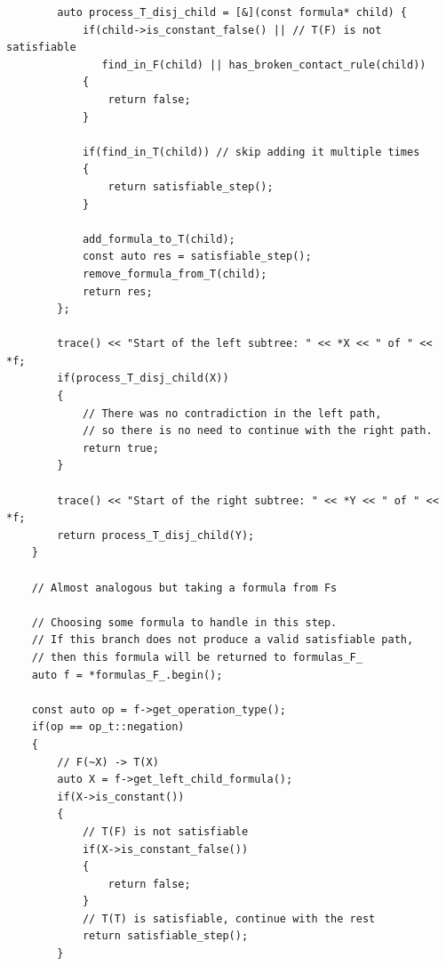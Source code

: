 \documentclass{article}
\begin{document}
\begin{lstlisting}
        auto process_T_disj_child = [&](const formula* child) {
            if(child->is_constant_false() || // T(F) is not satisfiable
               find_in_F(child) || has_broken_contact_rule(child))
            {
                return false;
            }

            if(find_in_T(child)) // skip adding it multiple times
            {
                return satisfiable_step();
            }

            add_formula_to_T(child);
            const auto res = satisfiable_step();
            remove_formula_from_T(child);
            return res;
        };

        trace() << "Start of the left subtree: " << *X << " of " << *f;
        if(process_T_disj_child(X))
        {
            // There was no contradiction in the left path,
            // so there is no need to continue with the right path.
            return true;
        }

        trace() << "Start of the right subtree: " << *Y << " of " << *f;
        return process_T_disj_child(Y);
    }

    // Almost analogous but taking a formula from Fs

    // Choosing some formula to handle in this step.
    // If this branch does not produce a valid satisfiable path,
    // then this formula will be returned to formulas_F_
    auto f = *formulas_F_.begin();

    const auto op = f->get_operation_type();
    if(op == op_t::negation)
    {
        // F(~X) -> T(X)
        auto X = f->get_left_child_formula();
        if(X->is_constant())
        {
            // T(F) is not satisfiable
            if(X->is_constant_false())
            {
                return false;
            }
            // T(T) is satisfiable, continue with the rest
            return satisfiable_step();
        }
\end{lstlisting}
\newpage
\end{document}
